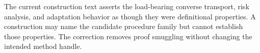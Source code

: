 The current construction text asserts the load-bearing converse transport, risk analysis, and adaptation behavior as though they were definitional properties.  A construction may name the candidate procedure family but cannot establish those properties.  The correction removes proof smuggling without changing the intended method handle.